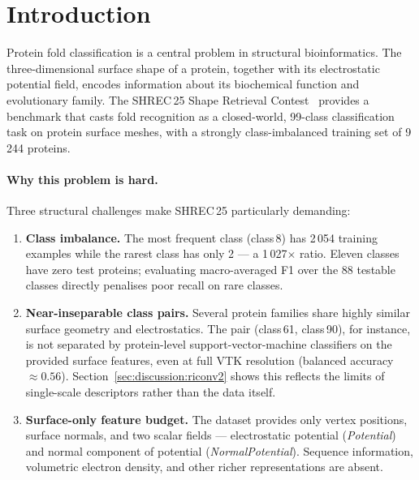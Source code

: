 \section{Introduction}
\label{sec:intro}

Protein fold classification is a central problem in structural bioinformatics.
The three-dimensional surface shape of a protein, together with its
electrostatic potential field, encodes information about its biochemical
function and evolutionary family.
The SHREC\,25 Shape Retrieval Contest~\cite{shrec25} provides a benchmark that
casts fold recognition as a closed-world, 99-class classification task on
protein surface meshes, with a strongly class-imbalanced training set of
9\,244 proteins.

\paragraph{Why this problem is hard.}
Three structural challenges make SHREC\,25 particularly demanding:
\begin{enumerate}
  \item \textbf{Class imbalance.}
        The most frequent class (class\,8) has 2\,054 training examples while
        the rarest class has only 2 --- a 1\,027$\times$ ratio.
        Eleven classes have zero test proteins; evaluating macro-averaged F1
        over the 88 testable classes directly penalises poor recall on rare
        classes.

  \item \textbf{Near-inseparable class pairs.}
        Several protein families share highly similar surface geometry and
        electrostatics.
        The pair (class\,61, class\,90), for instance, is not separated by
        protein-level support-vector-machine classifiers on the provided surface
        features, even at full VTK resolution (balanced accuracy $\approx 0.56$).
        Section~\ref{sec:discussion:riconv2} shows this reflects the limits of
        single-scale descriptors rather than the data itself.

  \item \textbf{Surface-only feature budget.}
        The dataset provides only vertex positions, surface normals, and two
        scalar fields --- electrostatic potential (\textit{Potential}) and
        normal component of potential (\textit{NormalPotential}).
        Sequence information, volumetric electron density, and other richer
        representations are absent.
\end{enumerate}

